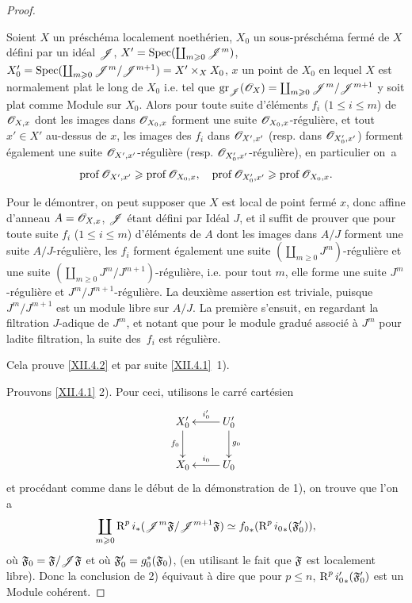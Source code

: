 \begin{proof}
\begin{lemme} \label{XII.4.2}
Soient $X$ un pr\'esch\'ema localement noeth\'erien, $X_0$ un sous-pr\'esch\'ema ferm\'e de $X$ d\'efini par un id\'eal ${\mathscr J}$, $X'=\operatorname{Spec}(\coprod_{m\geqslant 0} {\mathscr J}^m)$, $X_0'=\operatorname{Spec}(\coprod_{m\geqslant 0} {\mathscr J}^m/{\mathscr J}^{m+1}) = X'\times_XX_0$, $x$ un point de $X_0$ en lequel $X$ est normalement plat le long de $X_0$ i.e. tel que $\operatorname{gr}_{{\mathscr J}}(\mathscr{O}_X)= \coprod_{m\geqslant 0}{\mathscr J}^m/{\mathscr J}^{m+1}$ y soit plat comme Module sur $X_0$. Alors pour toute suite d'\'el\'ements $f_i$ ($1\leq i\leq m$) de ${\mathscr O}_{X, x}$ dont les images dans ${\mathscr O}_{X_0, x}$ forment une suite ${\mathscr O}_{X_0, x}$-r\'eguli\`ere, et tout $x'\in X'$ au-dessus de $x$, les images des $f_i$ dans ${\mathscr O}_{X', x'}$ (resp. dans ${\mathscr O}_{X'_0, x'}$) forment \'egalement une suite ${\mathscr O}_{X', x'}$-r\'eguli\`ere (resp. ${\mathscr O}_{X'_0, x'}$-r\'eguli\`ere), en particulier on~a
\steco
\begin{equation} \label{eq:XII.23}
\operatorname{prof} {\mathscr O}_{X', x'} \geqslant \operatorname{prof} {\mathscr O}_{X_0, x}, \quad \operatorname{prof} {\mathscr O}_{X'_0, x'} \geqslant \operatorname{prof} {\mathscr O}_{X_0, x}.
\end{equation}
\end{lemme}

Pour le d\'emontrer, on peut supposer que $X$ est local de point ferm\'e $x$, donc affine d'anneau $A={\mathscr O}_{X, x}$, ${\mathscr J}$ \'etant d\'efini par Id\'eal $J$, et il suffit de prouver que pour toute suite $f_i$ ($1\leq i\leq m$) d'\'el\'ements de $A$ dont les images dans $A/J$ forment une suite $A/J$-r\'eguli\`ere, les $f_i$ forment \'egalement une suite $(\coprod_{m\geq 0} J^m)$-r\'eguli\`ere et une suite $(\coprod_{m\geq 0} J^m/J^{m+1})$-r\'eguli\`ere, i.e. pour tout $m$, elle forme une suite $J^m$-r\'eguli\`ere et $J^m/J^{m+1}$-r\'eguli\`ere. La deuxi\`eme assertion est triviale, puisque $J^m/J^{m+1}$ est un module libre sur $A/J$. La premi\`ere s'ensuit, en regardant la filtration $J$-adique de $J^m$, et notant que pour le module gradu\'e associ\'e \`a $J^m$ pour ladite filtration, la suite des~$f_i$ est r\'eguli\`ere.

Cela prouve \ref{XII.4.2} et par suite \ref{XII.4.1}~1\noo).

Prouvons \ref{XII.4.1} 2\noo). Pour ceci, utilisons le carr\'e cart\'esien
\[
\xymatrix{
X^{\prime}_0\ar[d]_{f_0}&U^{\prime}_0\ar[l]_-{i^{\prime}_0}\ar[d]^{g_0} \\
X_0&U_0\ar[l]_-{i_0}
}
\]
et proc\'edant comme dans le d\'ebut de la d\'emonstration de 1\noo), on trouve que l'on a
\steco
\begin{equation} \label{eq:XII.24}
\coprod_{m\geqslant 0} \operatorname{R}^pi_\ast({\mathscr J}^m\mathfrak{F}/{\mathscr J}^{m+1}\mathfrak{F}) \simeq {f_0}_\ast (\operatorname{R}^p{i_0}_\ast(\mathfrak{F}_0')),
\end{equation}
o\`u $\mathfrak{F}_0=\mathfrak{F}/{\mathscr J}\mathfrak{F}$ et o\`u $\mathfrak{F}_0'=g_0^\ast(\mathfrak{F}_0)$, (en utilisant le fait que $\mathfrak{F}$ est localement libre). Donc la conclusion de 2\noo) \'equivaut \`a dire que pour $p\leq n$, $\operatorname{R}^p{i'_0}_\ast(\mathfrak{F}_0')$ est un Module coh\'erent.


\end{proof}
